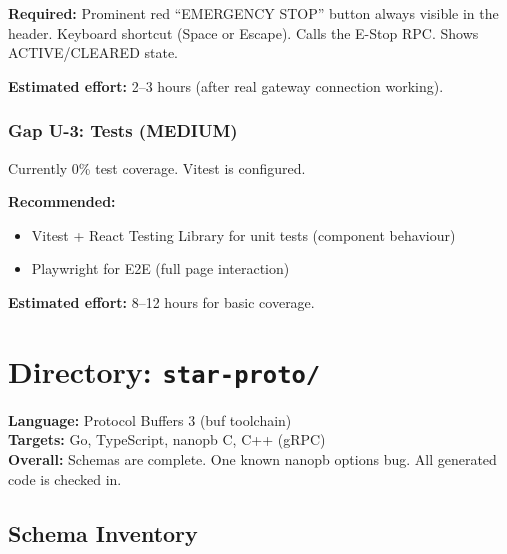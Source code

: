 \documentclass[12pt,a4paper]{article}
\begin{document}
\textbf{Required:} Prominent red ``EMERGENCY STOP'' button always visible in the header. Keyboard shortcut (Space or Escape). Calls the E-Stop RPC. Shows ACTIVE/CLEARED state.

\textbf{Estimated effort:} 2--3 hours (after real gateway connection working).

\subsubsection{Gap U-3: Tests (MEDIUM)}

Currently 0\% test coverage. Vitest is configured.

\textbf{Recommended:}
\begin{itemize}[noitemsep]
  \item Vitest + React Testing Library for unit tests (component behaviour)
  \item Playwright for E2E (full page interaction)
\end{itemize}

\textbf{Estimated effort:} 8--12 hours for basic coverage.

\newpage

\section{Directory: \texttt{star-proto/}}

\begin{dirbox}
  \textbf{Language:} Protocol Buffers 3 (buf toolchain)\\
  \textbf{Targets:} Go, TypeScript, nanopb C, C++ (gRPC)\\
  \textbf{Overall:} Schemas are complete. One known nanopb options bug. All generated code is checked in.
\end{dirbox}

\subsection{Schema Inventory}
\end{document}
